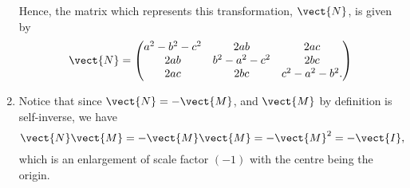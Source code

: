 \begin{enumerate}
          Hence, the matrix which represents this transformation, \(\vect{N}\), is given by
          \[
              \vect{N} = \begin{pmatrix}
                  a^2 - b^2 - c^2 & 2ab             & 2ac              \\
                  2ab             & b^2 - a^2 - c^2 & 2bc              \\
                  2ac             & 2bc             & c^2 - a^2 - b^2.
              \end{pmatrix}
          \]

    \item Notice that since \(\vect{N} = -\vect{M}\), and \(\vect{M}\) by definition is self-inverse, we have
          \[
              \vect{N} \vect{M} = - \vect{M} \vect{M} = - \vect{M}^2 = - \vect{I},
          \]
          which is an enlargement of scale factor \((-1)\) with the centre being the origin.
\end{enumerate}